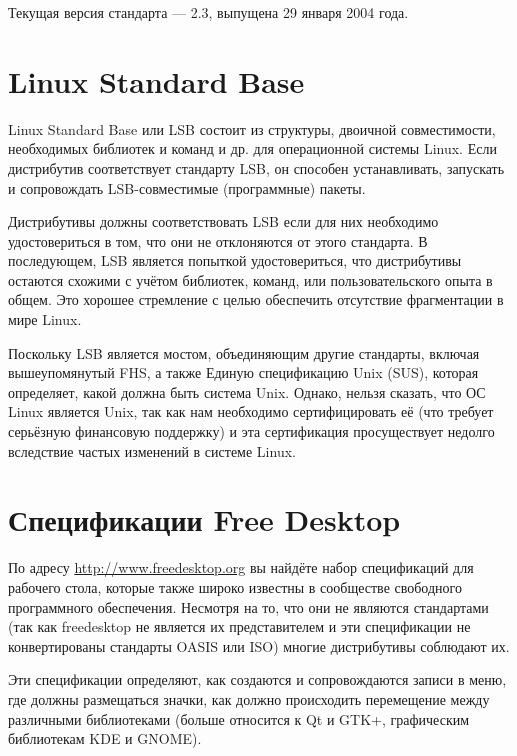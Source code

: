 \documentclass[12pt]{book}
\begin{document}
Текущая версия стандарта — 2.3, выпущена 29 января 2004 года.

\section{Linux Standard Base}

Linux Standard Base или LSB состоит из структуры, двоичной совместимости, необходимых библиотек и команд и др. для операционной системы Linux. Если дистрибутив соответствует стандарту LSB, он способен устанавливать, запускать и сопровождать LSB-совместимые (программные) пакеты.

Дистрибутивы должны соответствовать LSB если для них необходимо удостовериться в том, что они не отклоняются от этого стандарта. В последующем, LSB является попыткой удостовериться, что дистрибутивы остаются схожими с учётом библиотек, команд, или пользовательского опыта в общем. Это хорошее стремление с целью обеспечить отсутствие фрагментации в мире Linux.

Поскольку LSB является мостом, объединяющим другие стандарты, включая вышеупомянутый FHS, а также Единую спецификацию Unix (SUS), которая определяет, какой должна быть система Unix. Однако, нельзя сказать, что ОС Linux является Unix, так как нам необходимо сертифицировать её (что требует серьёзную финансовую поддержку) и эта сертификация просуществует недолго вследствие частых изменений в системе Linux.

\section{Спецификации Free Desktop}

По адресу  \href{http://www.freedesktop.org}{http://www.freedesktop.org} вы найдёте набор спецификаций для рабочего стола, которые также широко известны в сообществе свободного программного обеспечения. Несмотря на то, что они не являются стандартами (так как freedesktop не является их представителем и эти спецификации не конвертированы стандарты OASIS или ISO) многие дистрибутивы соблюдают их.

Эти спецификации определяют, как создаются и сопровождаются записи в меню, где должны размещаться значки, как должно происходить перемещение между различными библиотеками (больше относится к Qt и GTK+, графическим библиотекам KDE и GNOME).
\end{document}
